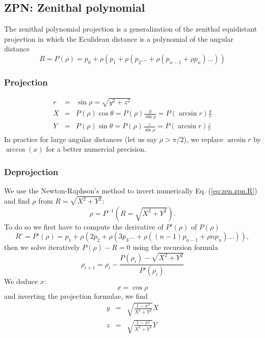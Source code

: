\subsection{ZPN: Zenithal polynomial}

  The zenithal polynomial projection is a generalization of
  the zenithal equidistant projection in which the Eculidean
  distance is a polynomial of the angular distance
  \begin{equation}
    R = P(\rho) = p_0 + \rho(p_1 + \rho(p_2... + \rho(p_{n-1} + \rho p_n )...))
    \label{eq:zen.zpn.R}
  \end{equation}

  \subsubsection{Projection}

    \begin{eqnarray}
      r & = & \sin\rho = \sqrt{y^2 + z^2} \\
      X & = & P(\rho)\cos\theta = P(\rho)\frac{y}{\sin\rho} = P(\arcsin r)\frac{y}{r} \\
      Y & = & P(\rho)\sin\theta = P(\rho)\frac{z}{\sin\rho} = P(\arcsin r)\frac{z}{r}
    \end{eqnarray}
    In practice for large angular distances (let us say $\rho>\pi/2$), we 
    replace $\arcsin r$ by $\arccos(x)$ for a better numercial precision.

  \subsubsection{Deprojection}

    We use the Newton-Raphson's method to invert numerically Eq. (\ref{eq:zen.zpn.R})
    and find $\rho$ from $R=\sqrt{X^2 + Y^2}$:
    \begin{equation}
      \rho = P^{-1}(R=\sqrt{X^2 + Y^2}).
    \end{equation}
    To do so we first have to compute the derivative of $P'(\rho)$ of $P(\rho)$
    \begin{equation}
      R' = P'(\rho) = p_1 + \rho(2p_2 + \rho(3p_3... + \rho((n-1)p_{n-1} + \rho n p_n )...)),
    \end{equation}
    then we solve iteratively $P(\rho) - R = 0$ using the recursion formula
    \begin{equation}
      \rho_{i+1} = \rho_i - \frac{P(\rho_i) - \sqrt{X^2 + Y^2}}{P'(\rho_ i)}
    \end{equation}
    We deduce $x$:
    \begin{equation}
      x = \cos\rho
    \end{equation}
    and inverting the projection formulae, we find
    \begin{eqnarray}
      y & = & \sqrt{\frac{1 - x^2}{X^2 + Y^2}}X \\
      z & = & \sqrt{\frac{1 - x^2}{X^2 + Y^2}}Y
    \end{eqnarray}
      
